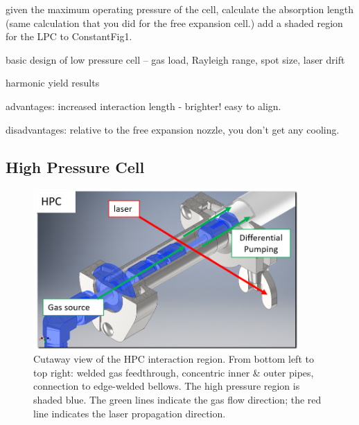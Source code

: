 given the maximum operating pressure of the cell, calculate the absorption length (same calculation that you did for the free expansion cell.) add a shaded region for the LPC to ConstantFig1.




basic design of low pressure cell -- gas load, Rayleigh range, spot size, laser drift


harmonic yield results

advantages: increased interaction length - brighter! easy to align.

disadvantages: relative to the free expansion nozzle, you don't get any cooling.

\subsection{High Pressure Cell}
\label{sec:HPC}

\begin{figure}
	\centering
	\includegraphics[width=0.9\textwidth]{figures/chap3/HPC_cutaway2.png}
	\caption{Cutaway view of the HPC interaction region. From bottom left to top right: welded gas feedthrough, concentric inner \& outer pipes, connection to edge-welded bellows. The high pressure region is shaded blue. The green lines indicate the gas flow direction; the red line indicates the laser propagation direction.}
	\label{fig:HPC_cutaway2}
\end{figure}

